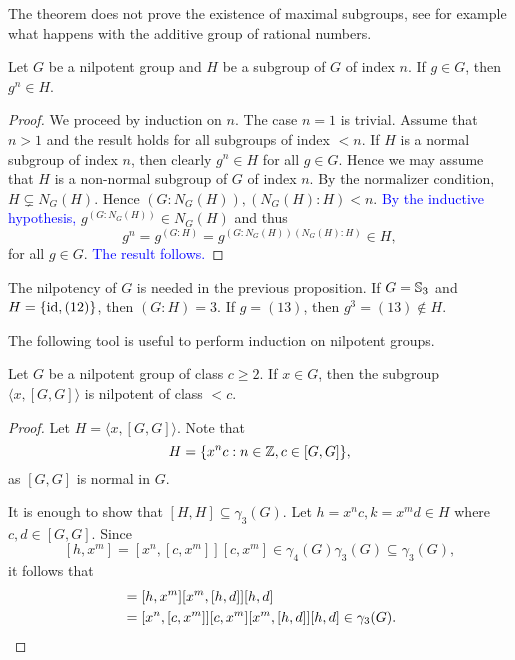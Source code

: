 The theorem does not prove the existence of maximal subgroups, see for example what happens with
the additive group of rational numbers. 

\begin{proposition}
	\label{pro:g^n}
	Let $G$ be a nilpotent group and $H$ be a subgroup of $G$ of index $n$. If 
	$g\in G$, then $g^n\in H$.
\end{proposition}

\begin{proof}
	We proceed by induction on $n$. The case $n=1$ is trivial. Assume  that $n>1$ and the result holds 
	for all subgroups of index $<n$. If $H$ is  a normal subgroup of index $n$, then clearly $g^n\in H$ for all $g\in G$. 
	Hence we may assume that $H$ is a non-normal subgroup of $G$ of index $n$. By the normalizer condition, $H\subsetneq N_G(H)$. Hence
	$(G:N_G(H)),(N_G(H):H)<n$. \textcolor{blue}{By the inductive hypothesis,} $g^{(G:N_G(H))}\in N_G(H)$ and thus 
	\[
		g^n=g^{(G:H)}=g^{(G:N_G(H))(N_G(H):H)}\in H, 
	\]
	for all $g\in G$. \textcolor{blue}{The result follows.}%
\end{proof}

\begin{example}
The nilpotency of $G$ is needed in the previous proposition. 
If $G=\mathbb{S}_3$ and $H=\{\operatorname{id},(12)\}$, then $(G:H)=3$. If 
$g=(13)$, then $g^{3}=(13)\not\in H$. 	
\end{example}

The following tool is useful to perform induction 
on nilpotent groups.  

\begin{lemma}
	\label{lem:a[GG]}
	Let $G$ be a nilpotent group of class $c\geq2$. If $x\in G$, then the subgroup 
	$\langle x,[G,G]\rangle$ is nilpotent of class $<c$.
\end{lemma}

\begin{proof}
	Let $H=\langle x,[G,G]\rangle$.   Note that  
	\[
		H=\{x^nc:n\in\mathbb{Z},c\in [G,G]\},
	\]
	as $[G,G]$ is normal in $G$. 
	
	It is enough to show that   
	$[H,H]\subseteq\gamma_3(G)$. Let $h=x^nc,k=x^md\in H$
	where $c,d\in [G,G]$. 
	Since 
	\[
	[h,x^m]=[x^n,[c,x^m]][c,x^m]\in\gamma_4(G)\gamma_3(G)\subseteq\gamma_3(G),
	\]
	it follows that  
	\begin{align*}
		[h,k]&=[h,x^m][x^m,[h,d]][h,d]\\
			&=[x^n,[c,x^m]][c,x^m][x^m,[h,d]][h,d]\in\gamma_3(G).\qedhere
	\end{align*}
\end{proof}

